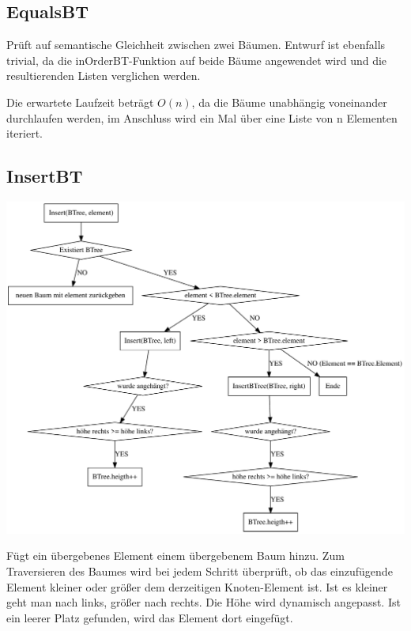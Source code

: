 \documentclass[11pt]{article}
\begin{document}
    \subsection{EqualsBT}
    Prüft auf semantische Gleichheit zwischen zwei Bäumen.
    Entwurf ist ebenfalls trivial, da die inOrderBT-Funktion
    auf beide Bäume angewendet wird und die resultierenden Listen verglichen werden.

    Die erwartete Laufzeit beträgt \begin{math}
                                       O(n)
    \end{math},
    da die Bäume unabhängig voneinander durchlaufen werden, im Anschluss wird
    ein Mal über eine Liste von n Elementen iteriert.

    \subsection{InsertBT}

    \begin{center}
        \includegraphics[width=1\columnwidth] {insert}
    \end{center}

    Fügt ein übergebenes Element einem übergebenem Baum hinzu.
    Zum Traversieren des Baumes wird bei jedem Schritt überprüft,
    ob das einzufügende Element kleiner oder größer dem derzeitigen Knoten-Element ist.
    Ist es kleiner geht man nach links, größer nach rechts.
    Die Höhe wird dynamisch angepasst.
    Ist ein leerer Platz gefunden,
    wird das Element dort eingefügt.
\end{document}
